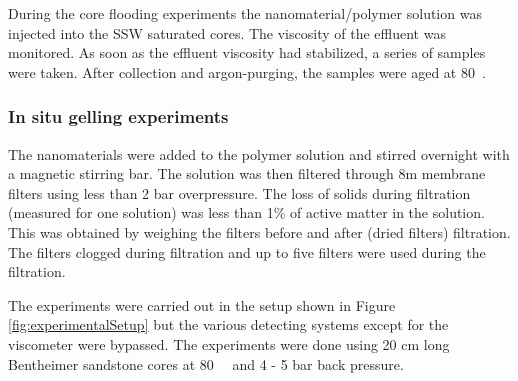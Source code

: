 \documentclass[nanomaterials,article,submit,moreauthors,pdftex]{Definitions/mdpi}
\begin{document}
During the core flooding experiments the nanomaterial/polymer solution was injected into the SSW saturated cores. The viscosity of the effluent was monitored. As soon as the effluent viscosity had stabilized, a series of samples were taken. After collection and argon-purging, the samples were aged at 80~\celsius. 

\subsubsection{In situ gelling experiments}

The nanomaterials were added to the polymer solution and stirred overnight with a magnetic stirring bar. The solution was then filtered through 8\micro m membrane filters using less than 2 bar overpressure. The loss of solids during filtration (measured for one solution) was less than 1\% of active matter in the solution. This was obtained by weighing the filters before and after (dried filters) filtration. The filters clogged during filtration and up to five filters were used during the filtration.

The experiments were carried out in the setup shown in Figure \ref{fig:experimentalSetup} but the various detecting systems except for the viscometer were bypassed. The experiments were done using 20 cm long Bentheimer sandstone cores at 80~\celsius~ and 4 - 5 bar back pressure.
\end{document}
